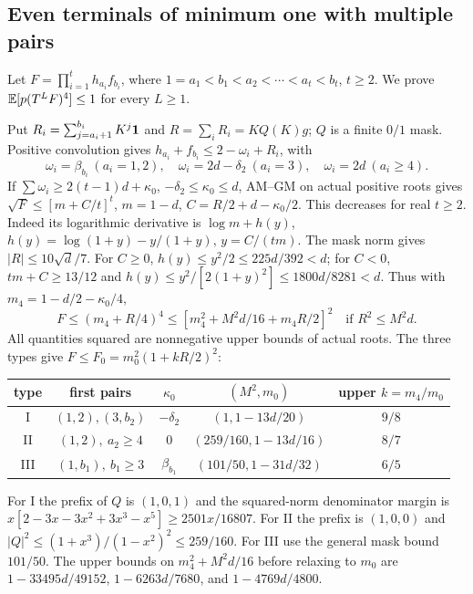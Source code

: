 \subsection{Even terminals of minimum one with multiple pairs}\label{loc:S29}
Let $F=\prod_{i=1}^th_{a_i}f_{b_i}$, where
$1=a_1<b_1<a_2<\cdots<a_t<b_t$, $t\ge2$.
We prove $\mathbb E[p(T^LF)^4]\le1$ for every $L\ge1$.

Put $R_i=\sum_{j=a_i+1}^{b_i}K^j\mathbf1$ and $R=\sum_iR_i=KQ(K)g$;
$Q$ is a finite $0/1$ mask. Positive convolution gives
$h_{a_i}+f_{b_i}\le2-\omega_i+R_i$, with
\[
 \omega_i=\beta_{b_i}\ (a_i=1,2),\quad
 \omega_i=2d-\delta_{2}\ (a_i=3),\quad\omega_i=2d\ (a_i\ge4).
\]
If $\sum\omega_i\ge2(t-1)d+\kappa_0$, $-\delta_{2}\le\kappa_0\le d$,
AM--GM on actual positive roots gives
$\sqrt F\le[m+C/t]^t$, $m=1-d$, $C=R/2+d-\kappa_0/2$.
This decreases for real $t\ge2$.
Indeed its logarithmic derivative is $\log m+h(y)$,
$h(y)=\log(1+y)-y/(1+y)$, $y=C/(tm)$.
The mask norm gives $|R|\le10\sqrt d/7$.
For $C\ge0$, $h(y)\le y^2/2\le225d/392<d$;
for $C<0$, $tm+C\ge13/12$ and
$h(y)\le y^2/[2(1+y)^2]\le1800d/8281<d$.
Thus with $m_4=1-d/2-\kappa_0/4$,
\[
 F\le(m_4+R/4)^4
 \le[m_4^2+M^2d/16+m_4R/2]^2
 \quad\text{if }R^2\le M^2d.
\]
All quantities squared are nonnegative upper bounds of actual roots.
The three types give $F\le F_0=m_0^2(1+kR/2)^2$:
\begin{center}
\begin{tabular}{@{}ccccc@{}}
\toprule
type & first pairs & $\kappa_0$ & $(M^2,m_0)$ & upper $k=m_4/m_0$\\\midrule
I & $(1,2),(3,b_2)$ & $-\delta_{2}$ & $(1,1-13d/20)$ & $9/8$\\
II & $(1,2),\ a_2\ge4$ & $0$ & $(259/160,1-13d/16)$ & $8/7$\\
III & $(1,b_1),\ b_1\ge3$ & $\beta_{b_1}$ & $(101/50,1-31d/32)$ & $6/5$\\\bottomrule
\end{tabular}
\end{center}
For I the prefix of $Q$ is $(1,0,1)$ and the squared-norm denominator
margin is $x[2-3x-3x^2+3x^3-x^5]\ge2501x/16807$.
For II the prefix is $(1,0,0)$ and
$|Q|^2\le(1+x^3)/(1-x^2)^2\le259/160$.
For III use the general mask bound $101/50$.
The upper bounds on $m_4^2+M^2d/16$ before relaxing to $m_0$ are
$1-33495d/49152$, $1-6263d/7680$, and $1-4769d/4800$.

